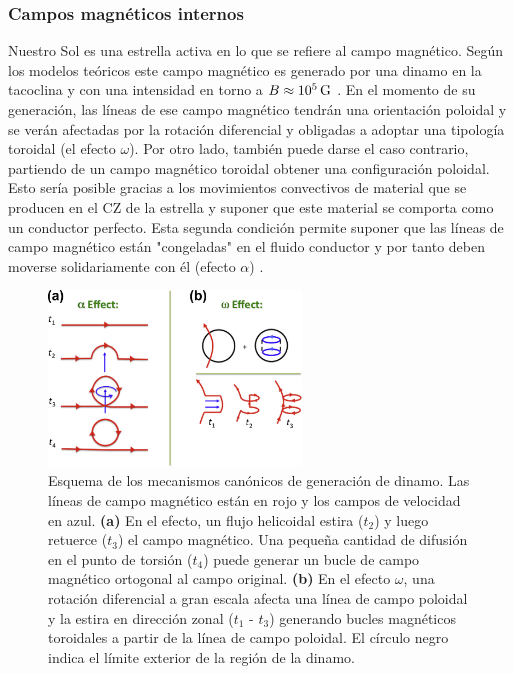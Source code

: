 \subsubsection{Campos magnéticos internos}
Nuestro Sol es una estrella activa en lo que se refiere al campo magnético. Según los modelos teóricos este campo magnético es generado por una dinamo en la tacoclina y con una intensidad en torno a $B\approx10^{5}\,\mathrm{G}$ \cite{Maeder2003a,Dudorov2014}. En el momento de su generación, las líneas de ese campo magnético tendrán una orientación poloidal y se verán afectadas por la rotación diferencial y obligadas a adoptar una tipología toroidal (el efecto $\omega$). Por otro lado, también puede darse el caso contrario, partiendo de un campo magnético toroidal obtener una configuración poloidal. Esto sería posible gracias a los movimientos convectivos de material que se producen en el CZ de la estrella y suponer que este material se comporta como un conductor perfecto. Esta segunda condición permite suponer que las líneas de campo magnético están "congeladas" en el fluido conductor y por tanto deben moverse solidariamente con él (efecto $\alpha$) \cite{Stanley2014}.\par

\begin{figure}
    \centering
    \includegraphics[width=0.6\textwidth]{img/tesis/alpha_omega_effect.png}
    \caption{Esquema de los mecanismos canónicos de generación de dinamo. Las líneas de campo magnético están en rojo y los campos de velocidad en azul. \textbf{(a)} En el efecto, un flujo helicoidal estira ($t_2$) y luego retuerce ($t_3$) el campo magnético. Una pequeña cantidad de difusión en el punto de torsión ($t_4$) puede generar un bucle de campo magnético ortogonal al campo original. \textbf{(b)} En el efecto $\omega$, una rotación diferencial a gran escala afecta una línea de campo poloidal y la estira en dirección zonal ($t_1$ - $t_3$) generando bucles magnéticos toroidales a partir de la línea de campo poloidal. El círculo negro indica el límite exterior de la región de la dinamo. \cite{Stanley2014}}
    \label{fig:alpha_omega_effect}
\end{figure}


